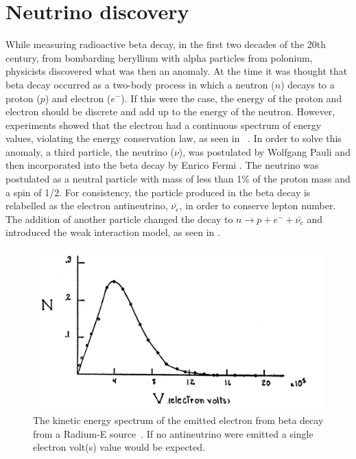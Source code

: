 \section{Neutrino discovery}\label{section:Theory}
While measuring radioactive beta decay, in the first two decades of the 20th century, from bombarding beryllium with alpha particles from polonium, physicists discovered what was then an anomaly. At the time it was thought that beta decay occurred as a two-body process in which a neutron ($n$) decays to a proton ($p$) and electron ($e^-$). If this were the case, the energy of the proton and electron should be discrete and add up to the energy of the neutron. However, experiments showed that the electron had a continuous spectrum of energy values, violating the energy conservation law, as seen in ~\cite{89Neary71}. In order to solve this anomaly, a third particle, the neutrino ($\nu$), was postulated by Wolfgang Pauli \cite{4Pauli:Online} and then incorporated into the beta decay by Enrico Fermi \cite{5Wilson}. The neutrino was postulated as a neutral particle with mass of less than 1\% of the proton mass and a spin of 1/2. For consistency, the particle produced in the beta decay is relabelled as the electron antineutrino, $\bar{\nu_e}$, in order to conserve lepton number. The addition of another particle changed the decay to $n \rightarrow p + e^- + \bar{\nu_e}$ and introduced the weak interaction model, as seen in . 

\begin{figure}[h!]
\includegraphics[width=\textwidth]{figures/betaRadium.jpeg}
\caption{The kinetic energy spectrum of the emitted electron from beta decay from a Radium-E source~\cite{RadiumE}. If no antineutrino were emitted a single electron volt(s) value would be expected.}
\label{fig:betaeng}
\end{figure}

